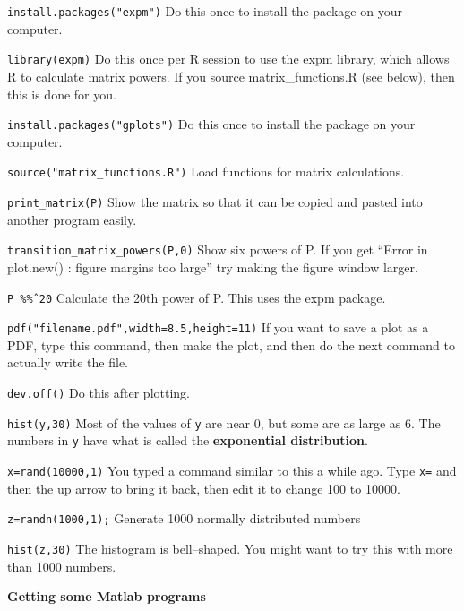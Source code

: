 
\item {\tt install.packages("expm")} \hfill Do this once to install the package on your computer.
\item {\tt library(expm)} \hfill Do this once per R session to use the expm library, which allows R to calculate matrix powers.  If you source matrix\_functions.R (see below), then this is done for you.
\item {\tt install.packages("gplots")} \hfill Do this once to install the package on your computer.
\item {\tt source("matrix\_functions.R")} \hfill Load functions for matrix calculations.

\item {\tt print\_matrix(P)} \hfill Show the matrix so that it can be copied and pasted into another program easily.

\item {\tt transition\_matrix\_powers(P,0)} \hfill Show six powers of P.  If you get ``Error in plot.new() : figure margins too large'' try making the figure window larger.

\item {\tt P \%\^\% 20} \hfill Calculate the 20th power of P.  This uses the expm package.

\item {\tt pdf("filename.pdf",width=8.5,height=11)} \hfill If you want to save a plot as a PDF, type this command, then make the plot, and then do the next command to actually write the file.
\item {\tt dev.off()} \hfill Do this after plotting.




\item {\tt hist(y,30)} \hfill Most of the values of {\tt y} are near 0, but
some are as large as 6.  The numbers in {\tt y} have what is called the
{\bf exponential distribution}.
\item {\tt x=rand(10000,1)} \hfill You typed a command similar to this a
while ago.  Type {\tt x=} and then the up arrow to bring it back, then edit
it to change 100 to 10000.
\item {\tt z=randn(1000,1);} \hfill Generate 1000 normally distributed numbers
\item {\tt hist(z,30)} \hfill The histogram is bell--shaped.  You might
want to try this with more than 1000 numbers.

\hspace*{-0.5in}
{\bf Getting some Matlab programs}

